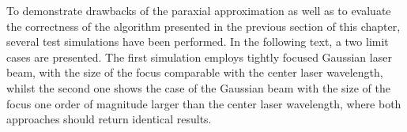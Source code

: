 To demonstrate drawbacks of the paraxial approximation as well as to evaluate the correctness of the algorithm presented in the previous section of this chapter, several test simulations have been performed. In the following text, a two limit cases are presented. The first simulation employs tightly focused Gaussian laser beam, with the size of the focus comparable with the center laser wavelength, whilst the second one shows the case of the Gaussian beam with the size of the focus one order of magnitude larger than the center laser wavelength, where both approaches should return identical results.

 

\begin{figure}[h!]
	\centering
	\hspace{2mm}
	\\

\end{figure}
